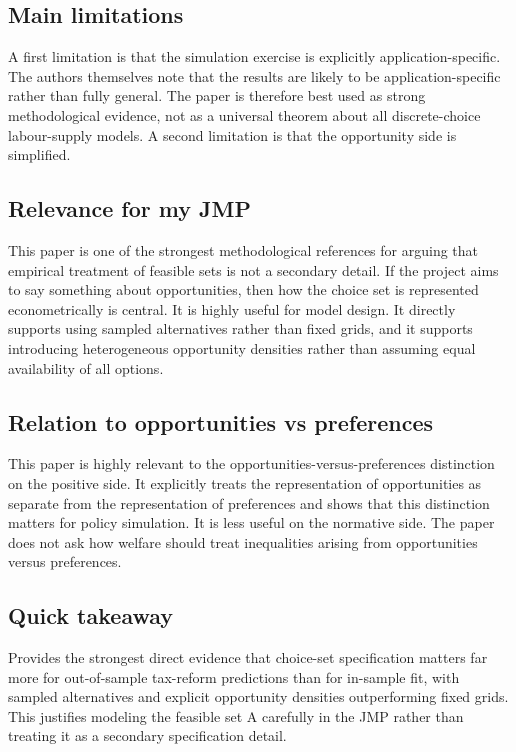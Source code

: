 \documentclass[11pt,a4paper]{article}
\begin{document}
\subsection*{Main limitations}
A first limitation is that the simulation exercise is explicitly application-specific. The authors themselves note that the results are likely to be application-specific rather than fully general. The paper is therefore best used as strong methodological evidence, not as a universal theorem about all discrete-choice labour-supply models. A second limitation is that the opportunity side is simplified.

\subsection*{Relevance for my JMP}
This paper is one of the strongest methodological references for arguing that empirical treatment of feasible sets is not a secondary detail. If the project aims to say something about opportunities, then how the choice set is represented econometrically is central. It is highly useful for model design. It directly supports using sampled alternatives rather than fixed grids, and it supports introducing heterogeneous opportunity densities rather than assuming equal availability of all options.

\subsection*{Relation to opportunities vs preferences}
This paper is highly relevant to the opportunities-versus-preferences distinction on the positive side. It explicitly treats the representation of opportunities as separate from the representation of preferences and shows that this distinction matters for policy simulation. It is less useful on the normative side. The paper does not ask how welfare should treat inequalities arising from opportunities versus preferences.

\subsection*{Quick takeaway}
Provides the strongest direct evidence that choice-set specification matters far more for out-of-sample tax-reform predictions than for in-sample fit, with sampled alternatives and explicit opportunity densities outperforming fixed grids. This justifies modeling the feasible set A carefully in the JMP rather than treating it as a secondary specification detail.
\end{document}
